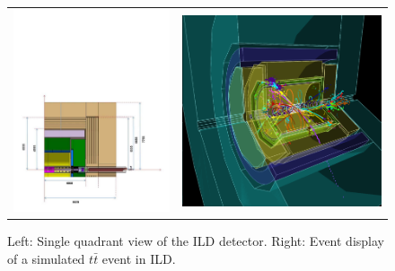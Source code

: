 \documentclass[%
 amsmath,amssymb,
 aps,
]{revtex4-1}
\begin{document}
\begin{figure}[tb]
 \begin{center}
 \begin{tabular}{lr}
 \includegraphics[width=0.48\hsize,clip]{figures/ILD_quadrant.pdf} & 
 \includegraphics[width=0.35\hsize]{figures/tt_500GeV_3D.png}
 \\
 \end{tabular}
\caption{Left: Single quadrant view of the ILD detector. Right: Event display of a simulated $t \bar t$ event in ILD.
\label{fig:ILD}}
 \end{center}
 \end{figure}
 
\end{document}
